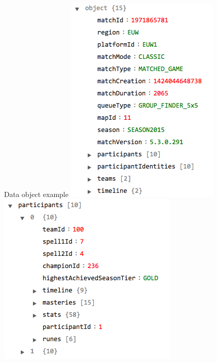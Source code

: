 \begin{frame}{Data object example}
\includegraphics[scale=0.5]{leagueoflegends/gameobject}
\includegraphics[scale=0.5]{leagueoflegends/participant}
\end{frame}